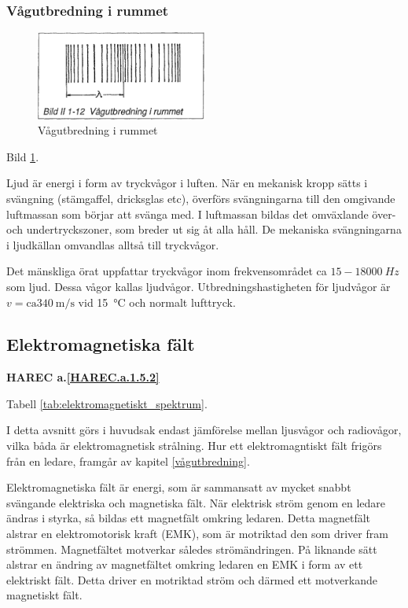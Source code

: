 \subsubsection{Vågutbredning i rummet}

\begin{figure}
  \includegraphics[width=0.5\textwidth]{images/bild_2_1-12}
  \caption{Vågutbredning i rummet}
  \label{fig:BildII1-12}
\end{figure}

Bild \ref{fig:BildII1-12}.

Ljud är energi i form av tryckvågor i luften. När en mekanisk kropp sätts i
svängning (stämgaffel, dricksglas etc), överförs svängningarna till den
omgivande luftmassan som börjar att svänga med. I luftmassan bildas det
omväxlande över- och undertryckszoner, som breder ut sig åt alla håll. De
mekaniska svängningarna i ljudkällan omvandlas alltså till tryckvågor.

Det mänskliga örat uppfattar tryckvågor inom frekvensområdet ca
\(15-18000\ Hz\) som ljud. Dessa vågor kallas ljudvågor. Utbredningshastigheten
för ljudvågor är \(v = \text{ca} 340\ \text{m/s}\) vid 15~°C och normalt lufttryck.

\subsection{Elektromagnetiska fält}
\textbf{HAREC a.\ref{HAREC.a.1.5.2}\label{myHAREC.a.1.5.2}}

Tabell \ref{tab:elektromagnetiskt_spektrum}.

I detta avsnitt görs i huvudsak endast jämförelse mellan ljusvågor och
radiovågor, vilka båda är elektromagnetisk strålning. Hur ett elektromagntiskt
fält frigörs från en ledare, framgår av kapitel \ref{vågutbredning}.

Elektromagnetiska fält är energi, som är sammansatt av mycket snabbt svängande
elektriska och magnetiska fält. När elektrisk ström genom en ledare ändras i
styrka, så bildas ett magnetfält omkring ledaren. Detta magnetfält alstrar en
elektromotorisk kraft (EMK), som är motriktad den som driver fram strömmen.
Magnetfältet motverkar således strömändringen. På liknande sätt alstrar en
ändring av magnetfältet omkring ledaren en EMK i form av ett elektriskt fält.
Detta driver en motriktad ström och därmed ett motverkande magnetiskt fält.

